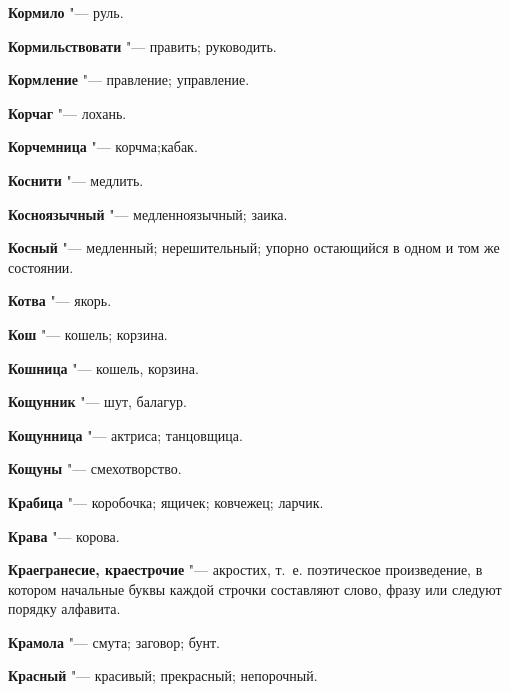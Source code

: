 \begin{mymulticols}{2}
\noindent\textbf{Кормило} "--- руль. 




\noindent\textbf{Кормильствовати} "--- править; руководить. 




\noindent\textbf{Кормление} "--- правление; управление. 




\noindent\textbf{Корчаг} "--- лохань. 




\noindent\textbf{Корчемница} "--- корчма;кабак. 




\noindent\textbf{Коснити} "--- медлить. 




\noindent\textbf{Косноязычный} "--- медленноязычный; заика. 




\noindent\textbf{Косный} "--- медленный; нерешительный; упорно остающийся в одном и том же состоянии. 




\noindent\textbf{Котва} "--- якорь. 




\noindent\textbf{Кош} "--- кошель; корзина. 




\noindent\textbf{Кошница} "--- кошель, корзина. 




\noindent\textbf{Кощунник} "--- шут, балагур. 




\noindent\textbf{Кощунница} "--- актриса; танцовщица. 




\noindent\textbf{Кощуны} "--- смехотворство. 




\noindent\textbf{Крабица} "--- коробочка; ящичек; ковчежец; ларчик. 




\noindent\textbf{Крава} "--- корова. 




\noindent\textbf{Краегранесие, краестрочие} "--- акростих, т.~е. поэтическое произведение, в котором начальные буквы каждой строчки составляют слово, фразу или следуют порядку алфавита. 




\noindent\textbf{Крамола} "--- смута; заговор; бунт. 




\noindent\textbf{Красный} "--- красивый; прекрасный; непорочный. 





\end{mymulticols}
